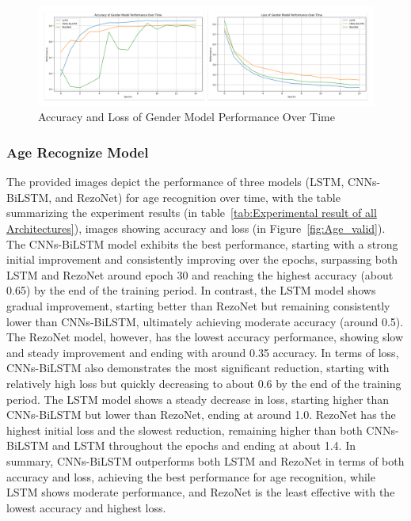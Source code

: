 \documentclass[conference, 10pt,onecolumn]{IEEEtran}
\begin{document}
\begin{figure}
    \centering
    \includegraphics[width=7 in]{Gender Model.pdf}
    \caption{Accuracy and Loss of Gender Model Performance Over Time}
    \label{fig:Gender_valid}
\end{figure}

\subsubsection{Age Recognize Model}
The provided images depict the performance of three models (LSTM, CNNs-BiLSTM, and RezoNet) for age recognition over time, with the  table summarizing the experiment results (in table~\ref{tab:Experimental result of all Architectures}), images showing accuracy and loss (in Figure~\ref{fig:Age_valid}). The CNNs-BiLSTM model exhibits the best performance, starting with a strong initial improvement and consistently improving over the epochs, surpassing both LSTM and RezoNet around epoch 30 and reaching the highest accuracy (about 0.65) by the end of the training period. In contrast, the LSTM model shows gradual improvement, starting better than RezoNet but remaining consistently lower than CNNs-BiLSTM, ultimately achieving moderate accuracy (around 0.5). The RezoNet model, however, has the lowest accuracy performance, showing slow and steady improvement and ending with around 0.35 accuracy. In terms of loss, CNNs-BiLSTM also demonstrates the most significant reduction, starting with relatively high loss but quickly decreasing to about 0.6 by the end of the training period. The LSTM model shows a steady decrease in loss, starting higher than CNNs-BiLSTM but lower than RezoNet, ending at around 1.0. RezoNet has the highest initial loss and the slowest reduction, remaining higher than both CNNs-BiLSTM and LSTM throughout the epochs and ending at about 1.4. In summary, CNNs-BiLSTM outperforms both LSTM and RezoNet in terms of both accuracy and loss, achieving the best performance for age recognition, while LSTM shows moderate performance, and RezoNet is the least effective with the lowest accuracy and highest loss.
\end{document}

